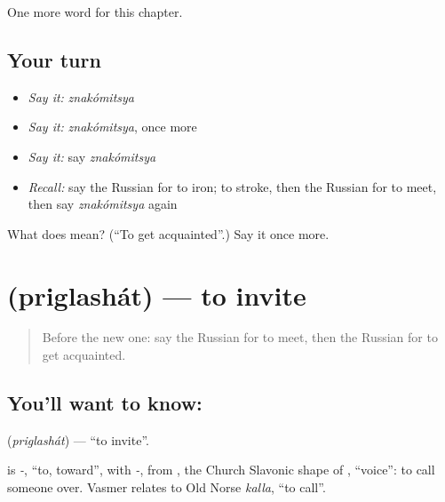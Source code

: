 \begin{grammarlens}[title={What you've built}]
One more word for this chapter.
\end{grammarlens}

\subsection*{Your turn}
\begin{itemize}
\raggedright
  \item \emph{Say it:} \emph{znakómitsya}
  \item \emph{Say it:} \emph{znakómitsya}, once more
  \item \emph{Say it:} say \emph{znakómitsya}
  \item \emph{Recall:} say the Russian for to iron; to stroke, then the Russian for to meet, then say \emph{znakómitsya} again
\end{itemize}

\begin{tcolorbox}[breakable,colback=teal!4,colframe=teal!35!black,title={Before you move on}]
What does  mean? (\textquotedblleft{}To get acquainted\textquotedblright{}.) Say it once more.
\end{tcolorbox}
\section[\texorpdfstring{\ru{приглашать} (priglashát)}{приглашать (priglashát)}]{ (priglashát) — to invite}

\label{lesson:RU-C141-priglashat}



\begin{quote}
Before the new one: say the Russian for to meet, then the Russian for to get acquainted.
\end{quote}

\subsection*{You'll want to know: }
\textbf{} (\emph{priglashát}) — \textquotedblleft{}to invite\textquotedblright{}.

\begin{cousinweb}
\textbf{} is \emph{-}, \textquotedblleft{}to, toward\textquotedblright{}, with \emph{-}, from \emph{}, the Church Slavonic shape of \emph{}, \textquotedblleft{}voice\textquotedblright{}: to call someone over. Vasmer relates \emph{} to Old Norse \emph{kalla}, \textquotedblleft{}to call\textquotedblright{}.
\end{cousinweb}

